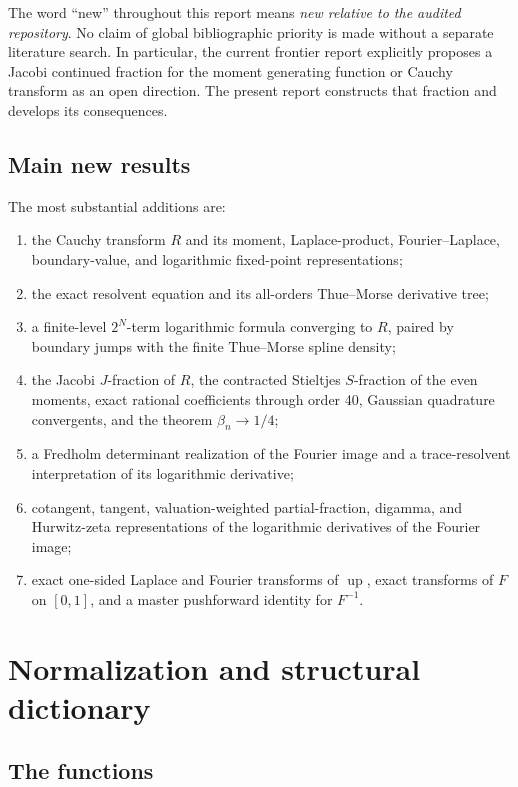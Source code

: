 \documentclass[11pt]{article}
\theoremstyle{definition}
\theoremstyle{remark}
\newcommand{\Up}{\operatorname{up}}
\begin{document}
The word ``new'' throughout this report means \emph{new relative to the audited repository}.
No claim of global bibliographic priority is made without a separate literature search.
In particular, the current frontier report explicitly proposes a Jacobi continued fraction
for the moment generating function or Cauchy transform as an open direction.  The present
report constructs that fraction and develops its consequences.

\subsection{Main new results}

The most substantial additions are:

\begin{enumerate}
\item the Cauchy transform \(R\) and its moment, Laplace-product, Fourier--Laplace,
      boundary-value, and logarithmic fixed-point representations;
\item the exact resolvent equation and its all-orders Thue--Morse derivative tree;
\item a finite-level \(2^N\)-term logarithmic formula converging to \(R\), paired by
      boundary jumps with the finite Thue--Morse spline density;
\item the Jacobi \(J\)-fraction of \(R\), the contracted Stieltjes \(S\)-fraction of the
      even moments, exact rational coefficients through order 40, Gaussian quadrature
      convergents, and the theorem \(\beta_n\to1/4\);
\item a Fredholm determinant realization of the Fourier image and a trace-resolvent
      interpretation of its logarithmic derivative;
\item cotangent, tangent, valuation-weighted partial-fraction, digamma, and Hurwitz-zeta
      representations of the logarithmic derivatives of the Fourier image;
\item exact one-sided Laplace and Fourier transforms of \(\Up\), exact transforms of
      \(F\) on \([0,1]\), and a master pushforward identity for \(F^{-1}\).
\end{enumerate}

\section{Normalization and structural dictionary}

\subsection{The functions}
\end{document}
